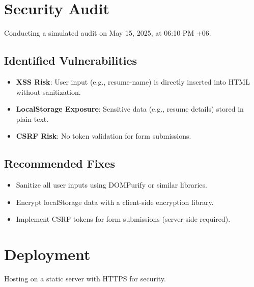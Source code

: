 \documentclass[a4paper,12pt]{article}
\begin{document}
\section{Security Audit}
Conducting a simulated audit on May 15, 2025, at 06:10 PM +06.

\subsection{Identified Vulnerabilities}
\begin{itemize}
  \item \textbf{XSS Risk}: User input (e.g., resume-name) is directly inserted into HTML without sanitization.
  \item \textbf{LocalStorage Exposure}: Sensitive data (e.g., resume details) stored in plain text.
  \item \textbf{CSRF Risk}: No token validation for form submissions.
\end{itemize}

\subsection{Recommended Fixes}
\begin{itemize}
  \item Sanitize all user inputs using DOMPurify or similar libraries.
  \item Encrypt localStorage data with a client-side encryption library.
  \item Implement CSRF tokens for form submissions (server-side required).
\end{itemize}

\section{Deployment}
Hosting on a static server with HTTPS for security.
\end{document}
